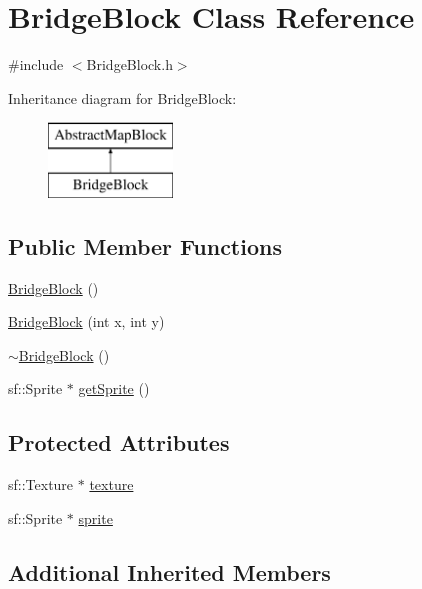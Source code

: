 \hypertarget{class_bridge_block}{}\section{Bridge\+Block Class Reference}
\label{class_bridge_block}


{\ttfamily \#include $<$Bridge\+Block.\+h$>$}

Inheritance diagram for Bridge\+Block\+:\begin{figure}[H]
\begin{center}
\leavevmode
\includegraphics[height=2.000000cm]{class_bridge_block}
\end{center}
\end{figure}
\subsection*{Public Member Functions}
\begin{DoxyCompactItemize}
\item 
\hyperlink{class_bridge_block_a3a383311a5e2472e435c1633eeccab3d}{Bridge\+Block} ()
\item 
\hyperlink{class_bridge_block_a17bb807971dbc0b222a27e6bd18a9085}{Bridge\+Block} (int x, int y)
\item 
\hyperlink{class_bridge_block_a56ad5e506bc091b779289a053bf45393}{$\sim$\+Bridge\+Block} ()
\item 
sf\+::\+Sprite $\ast$ \hyperlink{class_bridge_block_a6ea5fa76b21c9805702c7f214e661198}{get\+Sprite} ()
\end{DoxyCompactItemize}
\subsection*{Protected Attributes}
\begin{DoxyCompactItemize}
\item 
sf\+::\+Texture $\ast$ \hyperlink{class_bridge_block_aeab425af654b8ae2edc7ba29421fe5b0}{texture}
\item 
sf\+::\+Sprite $\ast$ \hyperlink{class_bridge_block_a93817188870fb7eb4137a90a7025a748}{sprite}
\end{DoxyCompactItemize}
\subsection*{Additional Inherited Members}


